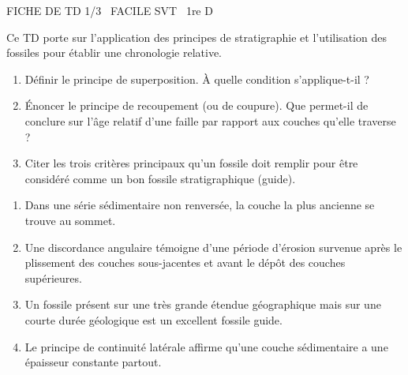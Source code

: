 \documentclass[11pt]{article}
\begin{document}
\begin{tcolorbox}[enhanced,colback=popink,colframe=popink,arc=10pt,boxrule=0pt,left=12pt,right=12pt,top=9pt,bottom=9pt]
{\color{white}\popxbold\small FICHE DE TD 1/3 \textbullet\ FACILE \hfill SVT \textbullet\ 1re D\par}
\end{tcolorbox}
\vspace{4pt}
Ce TD porte sur l'application des principes de stratigraphie et l'utilisation des fossiles pour établir une chronologie relative.

\begin{exercice}
\begin{enumerate}
    \item Définir le principe de superposition. À quelle condition s'applique-t-il ?
    \item Énoncer le principe de recoupement (ou de coupure). Que permet-il de conclure sur l'âge relatif d'une faille par rapport aux couches qu'elle traverse ?
    \item Citer les trois critères principaux qu'un fossile doit remplir pour être considéré comme un bon fossile stratigraphique (guide).
\end{enumerate}
\end{exercice}

\begin{exercice}
\begin{enumerate}
    \item Dans une série sédimentaire non renversée, la couche la plus ancienne se trouve au sommet.
    \item Une discordance angulaire témoigne d'une période d'érosion survenue après le plissement des couches sous-jacentes et avant le dépôt des couches supérieures.
    \item Un fossile présent sur une très grande étendue géographique mais sur une courte durée géologique est un excellent fossile guide.
    \item Le principe de continuité latérale affirme qu'une couche sédimentaire a une épaisseur constante partout.
\end{enumerate}
\end{exercice}
\end{document}
